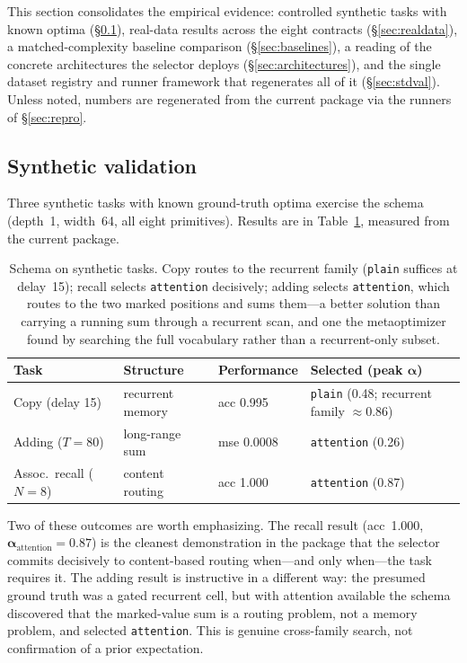 \documentclass[11pt]{article}
\newcommand{\allowbreakhere}{\discretionary{}{}{}}
\newcommand{\code}[1]{\texttt{\def\_{\char`_\allowbreakhere}#1}}
\newcommand{\alphapar}{\bm{\alpha}}
\begin{document}
This section consolidates the empirical evidence: controlled synthetic tasks with known optima
(\S\ref{sec:synthetic}), real-data results across the eight contracts (\S\ref{sec:realdata}), a
matched-complexity baseline comparison (\S\ref{sec:baselines}), a reading of the concrete architectures
the selector deploys (\S\ref{sec:architectures}), and the single dataset registry and runner framework
that regenerates all of it (\S\ref{sec:stdval}). Unless noted, numbers are regenerated from the current
package via the runners of \S\ref{sec:repro}.

\subsection{Synthetic validation}
\label{sec:synthetic}

Three synthetic tasks with known ground-truth optima exercise the schema
(depth~1, width~64, all eight primitives). Results are in Table~\ref{tab:synthetic}, measured
from the current package.

\begin{table}[h]
\centering
\small
\renewcommand{\arraystretch}{1.2}
\begin{tabular}{p{3.2cm} p{2.6cm} p{2.2cm} p{4.6cm}}
\toprule
\textbf{Task} & \textbf{Structure} & \textbf{Performance} & \textbf{Selected (peak $\alphapar$)}\\
\midrule
Copy (delay 15) & recurrent memory & acc 0.995 & \code{plain} (0.48; recurrent family $\approx0.86$)\\
Adding ($T{=}80$) & long-range sum & mse 0.0008 & \code{attention} (0.26)\\
Assoc.\ recall ($N{=}8$) & content routing & acc 1.000 & \code{attention} (0.87)\\
\bottomrule
\end{tabular}
\caption{Schema on synthetic tasks. Copy routes to the recurrent family (\code{plain}
suffices at delay~15); recall selects \code{attention} decisively; adding selects
\code{attention}, which routes to the two marked positions and sums them---a better solution
than carrying a running sum through a recurrent scan, and one the metaoptimizer found by
searching the full vocabulary rather than a recurrent-only subset.}
\label{tab:synthetic}
\end{table}

Two of these outcomes are worth emphasizing. The recall result (acc~1.000, $\alphapar_{\mathrm{
attention}}=0.87$) is the cleanest demonstration in the package that the selector commits
decisively to content-based routing when---and only when---the task requires it. The adding
result is instructive in a different way: the presumed ground truth was a gated recurrent cell,
but with attention available the schema discovered that the marked-value sum is a routing
problem, not a memory problem, and selected \code{attention}. This is genuine cross-family
search, not confirmation of a prior expectation.
\end{document}
